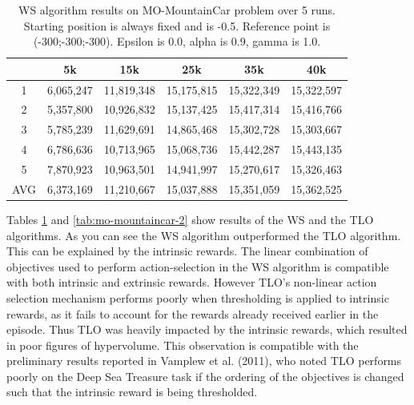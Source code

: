 \begin{table}[t]
\centering
\def\arraystretch{1.5}
\begin{tabular}{|c|c|c|c|c|c|}
  \hline
  & 5k & 15k & 25k & 35k & 40k \\
  \hline
  1 & 6,065,247 & 11,819,348 & 15,175,815 & 15,322,349 & 15,322,597 \\
  \hline
  2 & 5,357,800 & 10,926,832 & 15,137,425 & 15,417,314 & 15,416,766 \\
  \hline
  3 & 5,785,239 & 11,629,691 & 14,865,468 & 15,302,728 & 15,303,667 \\
  \hline
  4 & 6,786,636 & 10,713,965 & 15,068,736 & 15,442,287 & 15,443,135 \\
  \hline
  5 & 7,870,923 & 10,963,501 & 14,941,997 & 15,270,617 & 15,326,463 \\
  \hline
  AVG & 6,373,169 & 11,210,667 & 15,037,888 & 15,351,059 & 15,362,525 \\
  \hline
\end{tabular}
\caption{WS algorithm results on MO-MountainCar problem over 5 runs. Starting position is always fixed and is -0.5. Reference point is (-300;-300;-300). Epsilon is 0.0, alpha is 0.9, gamma is 1.0.}
\label{tab:mo-mountaincar-1}
\end{table}

Tables \ref{tab:mo-mountaincar-1} and \ref{tab:mo-mountaincar-2} show results of the WS and the TLO algorithms. As you can see the WS algorithm outperformed the TLO algorithm. This can be explained by the intrinsic rewards. The linear combination of objectives used to perform action-selection in the WS algorithm is compatible with both intrinsic and extrinsic rewards. However TLO’s non-linear action selection mechanism performs poorly when thresholding is applied to intrinsic rewards, as it fails to account for the rewards already received earlier in the episode. Thus TLO was heavily impacted by the intrinsic rewards, which resulted in poor figures of hypervolume. This observation is compatible with the preliminary results reported in Vamplew et al. (2011)\nocite{vamplew2011empirical}, who noted TLO performs poorly on the Deep Sea Treasure task if the ordering of the objectives is changed such that the intrinsic reward is being thresholded.

